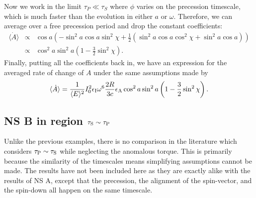 \documentclass[../full_thesis/full_thesis.tex]{subfiles}
\begin{document}
Now we work in the limit $\tau_P \ll \tau_S$ where $\phi$ varies on the
precession timescale, which is much faster than the evolution in either $a$ or $\omega$.
Therefore, we can average over a free precession period and drop the constant
coefficients:
\begin{eqnarray*}
\langle\dot{A}\rangle &\propto& \cos a \left(-\sin^{2}a\cos a \sin^{2}\chi +
       \frac{1}{2}\left(\sin^{2}a\cos a \cos^{2}\chi +
       \sin^{2}a \cos a \right) \right) \\
& \propto& \cos^{2} a \sin^{2}a\left(1-\frac{3}{2}\sin^{2}\chi\right).
\end{eqnarray*}
Finally, putting all the coefficients back in, we have an expression for the averaged
rate of change of $A$ under the same assumptions made by \citet{Goldreich1970}
\begin{equation}
\langle \dot{A} \rangle =\frac{1}{\langle E\rangle ^{2}}I_{0}^{2}
                         \epsilon_{\mathrm{I}}\omega^{6}\frac{2R}{3c}\epsilon_{\mathrm{A}}
                         \cos^{2} a \sin^{2}a
                         \left(1-\frac{3}{2}\sin^{2}\chi\right).
\label{eqn: A dot}
\end{equation}


\FloatBarrier
\subsection{NS B in region \texorpdfstring{$\tau_{\mathrm{S}}\sim \tau_{\mathrm{P}}$}{}}
\label{sec: B_NA}
Unlike the previous examples, there is no comparison in the literature which
considers $\tau_{\mathrm{P}}\sim\tau_{\mathrm{S}}$ while neglecting the anomalous torque. This is
primarily because the similarity of the timescales means simplifying
assumptions cannot be made. The results have not been included here as they are
exactly alike with the results of NS A, except that the
precession, the alignment of the spin-vector, and the
spin-down all happen on the same timescale.
\end{document}
